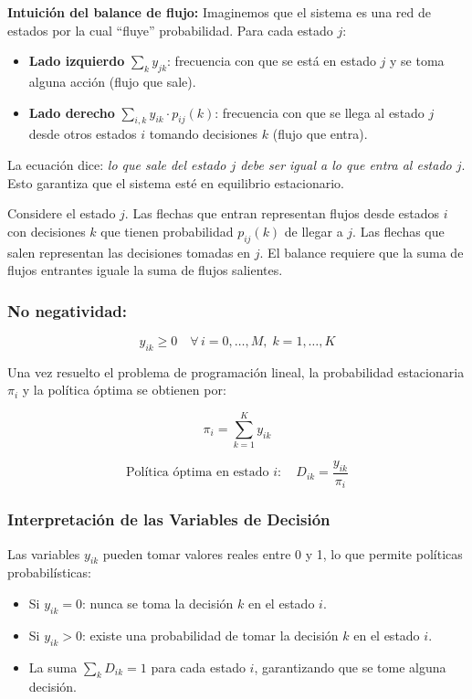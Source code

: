 \documentclass[a4paper,11pt]{article}
\begin{document}
\vspace{0.5em}

\textbf{Intuición del balance de flujo:} Imaginemos que el sistema es una red de estados por la cual ``fluye'' probabilidad. Para cada estado $j$:

\begin{itemize}
    \item \textbf{Lado izquierdo} $\sum_{k} y_{jk}$: frecuencia con que se está en estado $j$ y se toma alguna acción (flujo que sale).
    \item \textbf{Lado derecho} $\sum_{i,k} y_{ik} \cdot p_{ij}(k)$: frecuencia con que se llega al estado $j$ desde otros estados $i$ tomando decisiones $k$ (flujo que entra).
\end{itemize}

La ecuación dice: \textit{lo que sale del estado $j$ debe ser igual a lo que entra al estado $j$}. Esto garantiza que el sistema esté en equilibrio estacionario.

\vspace{0.5em}

Considere el estado $j$. Las flechas que entran representan flujos desde estados $i$ con decisiones $k$ que tienen probabilidad $p_{ij}(k)$ de llegar a $j$. Las flechas que salen representan las decisiones tomadas en $j$. El balance requiere que la suma de flujos entrantes iguale la suma de flujos salientes.

\subsubsection{No negatividad:}
\[y_{ik} \geq 0 \quad \forall\, i = 0, \ldots, M, \; k = 1, \ldots, K\]

Una vez resuelto el problema de programación lineal, la probabilidad estacionaria $\pi_i$ y la política óptima se obtienen por:

\[\pi_i = \sum_{k=1}^{K} y_{ik}\]

\[\text{Política óptima en estado } i: \quad D_{ik} = \frac{y_{ik}}{\pi_i}\]

\subsubsection{Interpretación de las Variables de Decisión}

Las variables $y_{ik}$ pueden tomar valores reales entre 0 y 1, lo que permite políticas probabilísticas:

\begin{itemize}
    \item Si $y_{ik} = 0$: nunca se toma la decisión $k$ en el estado $i$.
    \item Si $y_{ik} > 0$: existe una probabilidad de tomar la decisión $k$ en el estado $i$.
    \item La suma $\sum_{k} D_{ik} = 1$ para cada estado $i$, garantizando que se tome alguna decisión.
\end{itemize}
\end{document}
